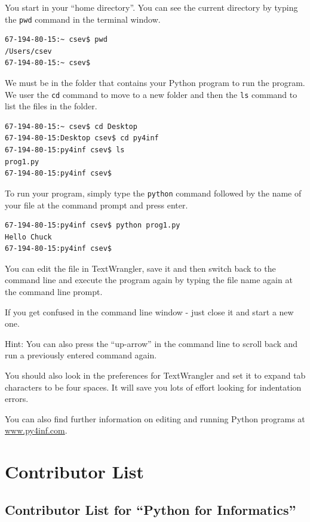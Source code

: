 \documentclass[10pt]{book}
\begin{document}
You start in your ``home directory''.  You can see the current 
directory by typing the {\tt pwd} command in the terminal window.

\beforeverb
\begin{verbatim}
67-194-80-15:~ csev$ pwd
/Users/csev
67-194-80-15:~ csev$ 
\end{verbatim}
\afterverb
%
We must be in the folder that contains your Python program 
to run the program.  We user the {\tt cd} command to move to a new 
folder and then the {\tt ls} command to list the files in the 
folder.

\beforeverb
\begin{verbatim}
67-194-80-15:~ csev$ cd Desktop
67-194-80-15:Desktop csev$ cd py4inf
67-194-80-15:py4inf csev$ ls
prog1.py
67-194-80-15:py4inf csev$ 
\end{verbatim}
\afterverb
%
To run your program, simply type the {\tt python} command followed
by the name of your file at the 
command prompt and press enter.

\beforeverb
\begin{verbatim}
67-194-80-15:py4inf csev$ python prog1.py
Hello Chuck
67-194-80-15:py4inf csev$ 
\end{verbatim}
\afterverb
%
You can edit the file in TextWrangler, save it and then switch back
to the command line and execute the program again by typing
the file name again at the command line prompt.

If you get confused in the command line window - just close it
and start a new one.

Hint: You can also press the ``up-arrow'' in the command line to 
scroll back and run a previously entered command again.

You should also look in the preferences for TextWrangler and set it 
to expand tab characters to be four spaces.  It will save you lots
of effort looking for indentation errors.

You can also find further information on editing and running 
Python programs at \url{www.py4inf.com}.



\chapter{Contributor List}
\section*{Contributor List for ``Python for Informatics''}
\end{document}
